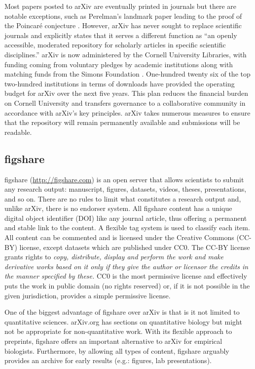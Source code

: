 \documentclass[letterpaper,twocolumn,superscriptaddress,showkeys,longbibliography]{revtex4-1}
\begin{document}
Most papers posted to arXiv are eventually printed in journals but there are
notable exceptions, such as Perelman's landmark paper leading to the proof of
the Poincar\'{e} conjecture \cite{2002math.....11159P}.  However, arXiv has
never sought to replace scientific journals and explicitly states that it serves
a different function as ``an openly accessible, moderated repository for
scholarly articles in specific scientific disciplines.'' arXiv is now
administered by the Cornell University Libraries, with funding coming from
voluntary pledges by academic institutions along with matching funds from the
Simons Foundation \cite{arxiv_future}.  One-hundred twenty six of the top
two-hundred institutions in terms of downloads have provided the operating
budget for arXiv over the next five years.  This plan reduces the financial
burden on Cornell University and transfers governance to a collaborative
community in accordance with arXiv's key principles.  arXiv takes numerous
measures to ensure that the repository will remain permanently available and
submissions will be readable.

\subsection{figshare}

figshare (\href{http://figshare.com}{http://figshare.com}) is an open server
that allows scientists to submit any research output: manuscript, figures,
datasets, videos, theses, presentations, and so on. There are no rules to limit
what constitutes a research output and, unlike arXiv, there is no endorser
system. All figshare content has a unique digital object identifier (DOI) like
any journal article, thus offering a permanent and stable link to the content.
A flexible tag system is used to classify each item. All content can be
commented and is licensed under the Creative Commons (CC-BY) license, except
datasets which are published under CC0. The CC-BY license grants rights to
\emph{copy, distribute, display and perform the work and make derivative works
based on it only if they give the author or licensor the credits in the manner
specified by these.}  CC0 is the most permissive license and effectively puts
the work in public domain (no rights reserved) or, if it is not possible in the
given jurisdiction, provides a simple permissive license.

One of the biggest advantage of figshare over arXiv is that is it not limited to
quantitative sciences. arXiv.org has sections on quantitative biology but might
not be appropriate for non-quantitative work. With its flexible approach to
preprints, figshare offers an important alternative to arXiv for empirical
biologists. Furthermore, by allowing all types of content, figshare arguably
provides an archive for early results (e.g.: figures, lab presentations).
\end{document}
